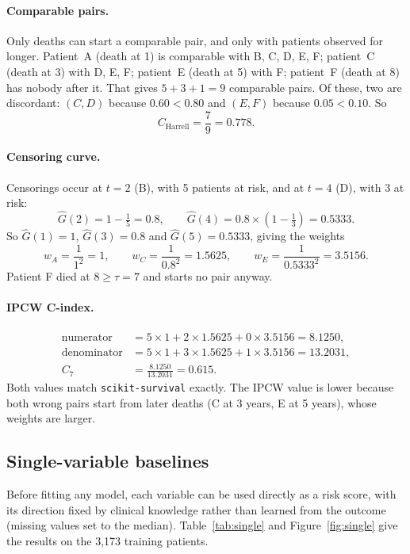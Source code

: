 \documentclass[11pt,a4paper]{article}
\begin{document}
\paragraph{Comparable pairs.} Only deaths can start a comparable pair, and only with
patients observed for longer. Patient~A (death at 1) is comparable with B, C, D, E, F;
patient~C (death at 3) with D, E, F; patient~E (death at 5) with F; patient~F (death at
8) has nobody after it. That gives $5 + 3 + 1 = 9$ comparable pairs. Of these, two are
discordant: $(C, D)$ because $0.60 < 0.80$ and $(E, F)$ because $0.05 < 0.10$. So
\[
C_{\text{Harrell}} = \frac{7}{9} = 0.778.
\]

\paragraph{Censoring curve.} Censorings occur at $t=2$ (B), with 5 patients at risk,
and at $t = 4$ (D), with 3 at risk:
\[
\hat G(2) = 1 - \tfrac{1}{5} = 0.8, \qquad
\hat G(4) = 0.8 \times \left(1 - \tfrac{1}{3}\right) = 0.5333.
\]
So $\hat G(1) = 1$, $\hat G(3) = 0.8$ and $\hat G(5) = 0.5333$, giving the weights
\[
w_A = \frac{1}{1^2} = 1, \qquad
w_C = \frac{1}{0.8^2} = 1.5625, \qquad
w_E = \frac{1}{0.5333^2} = 3.5156.
\]
Patient F died at $8 \ge \tau = 7$ and starts no pair anyway.

\paragraph{IPCW C-index.}
\begin{align*}
\text{numerator}   &= 5\times 1 + 2 \times 1.5625 + 0 \times 3.5156 = 8.1250,\\
\text{denominator} &= 5\times 1 + 3 \times 1.5625 + 1 \times 3.5156 = 13.2031,\\
C_7 &= \frac{8.1250}{13.2031} = 0.615.
\end{align*}
Both values match \texttt{scikit-survival} exactly. The IPCW value is lower because both
wrong pairs start from later deaths (C at 3 years, E at 5 years), whose weights are
larger.

\subsection{Single-variable baselines}
Before fitting any model, each variable can be used directly as a risk score, with its
direction fixed by clinical knowledge rather than learned from the outcome (missing
values set to the median). Table~\ref{tab:single} and Figure~\ref{fig:single} give the
results on the 3{,}173 training patients.
\end{document}
